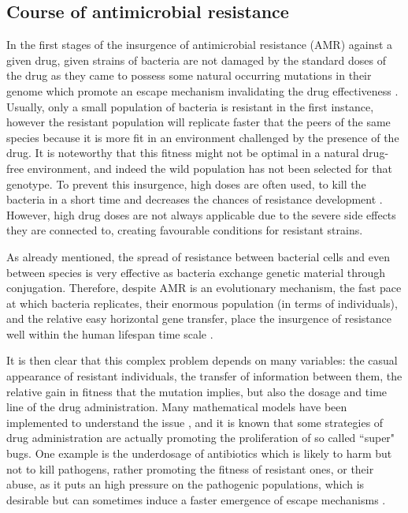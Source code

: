 \subsection{Course of antimicrobial resistance} \label{sec:course_AMR}
In the first stages of the insurgence of antimicrobial resistance (AMR) against a given drug, given strains of bacteria are not damaged by the standard doses of the drug as they came to possess some natural occurring mutations in their genome which promote an escape mechanism invalidating the drug effectiveness \citep{Kapoor2017,Blair2014}. Usually, only a small population of bacteria is resistant in the first instance, however the resistant population will replicate faster that the peers of the same species because it is more fit in an environment challenged by the presence of the drug. It is noteworthy that this fitness might not be optimal in a natural drug-free environment, and indeed the wild population has not been selected for that genotype.
%
To prevent this insurgence, high doses are often used, to kill the bacteria in a short time and decreases the chances of resistance development \citep{Baker2018}. However, high drug doses are not always applicable due to the severe side effects they are connected to, creating favourable conditions for resistant strains.

As already mentioned, the spread of resistance between bacterial cells and even between species is very effective as bacteria exchange genetic material through conjugation.
%
Therefore, despite AMR is an evolutionary mechanism, the fast pace at which bacteria replicates, their enormous population (in terms of individuals), and the relative easy horizontal gene transfer, place the insurgence of resistance well within the human lifespan time scale \citep{Oneill2016}.

It is then clear that this complex problem depends on many variables: the casual appearance of resistant individuals, the transfer of information between them, the relative gain in fitness that the mutation implies, but also the dosage and time line of the drug administration. Many mathematical models have been implemented to understand the issue \citep{Birkegard2018,Niewiadomska2019}, and it is known that some strategies of drug administration are actually promoting the proliferation of so called ``super" bugs.
%
One example is the underdosage of antibiotics which is likely to harm but not to kill pathogens, rather promoting the fitness of resistant ones, or their abuse, as it puts an high pressure on the pathogenic populations, which is desirable but can sometimes induce a faster emergence of escape mechanisms \citep{Oneill2016}.

